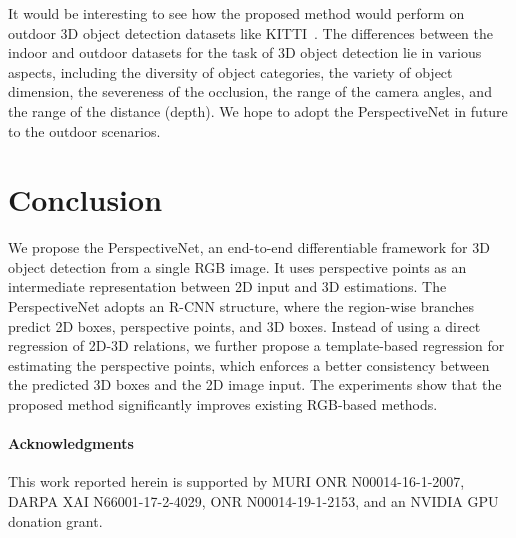 \documentclass{article}
\begin{document}
It would be interesting to see how the proposed method would perform on outdoor 3D object detection datasets like KITTI~\cite{geiger2013vision}. The differences between the indoor and outdoor datasets for the task of 3D object detection lie in various aspects, including the diversity of object categories, the variety of object dimension, the severeness of the occlusion, the range of the camera angles, and the range of the distance (depth). We hope to adopt the PerspectiveNet in future to the outdoor scenarios.

\section{Conclusion}

We propose the PerspectiveNet, an end-to-end differentiable framework for 3D object detection from a single RGB image. It uses perspective points as an intermediate representation between 2D input and 3D estimations. The PerspectiveNet adopts an R-CNN structure, where the region-wise branches predict 2D boxes, perspective points, and 3D boxes. Instead of using a direct regression of 2D-3D relations, we further propose a template-based regression for estimating the perspective points, which enforces a better consistency between the predicted 3D boxes and the 2D image input. The experiments show that the proposed method significantly improves existing RGB-based methods.

\paragraph{Acknowledgments}

This work reported herein is supported by MURI ONR N00014-16-1-2007, DARPA XAI N66001-17-2-4029, ONR N00014-19-1-2153, and an NVIDIA GPU donation grant.

\newpage
{}

\setlength{\bibsep}{4pt}

\end{document}
